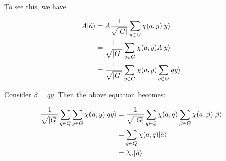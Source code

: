 \documentclass[12pt]{report}
\begin{document}
To see this, we have

        \begin{align}
            A\lvert\hat{a}\rangle 
            &= A\frac{1}{\sqrt{|G|}}\sum_{y \in G}\chi(a,y)\lvert y\rangle \nonumber \\
            &= \frac{1}{\sqrt{|G|}}\sum_{y \in G}\chi(a,y)A\lvert y\rangle \nonumber \\
            &= \frac{1}{\sqrt{|G|}}\sum_{y \in G}\chi(a,y)\sum_{q \in Q}\lvert qy\rangle \nonumber
            \end{align}
            
            \noindent Consider $\beta = qy$. Then the above equation becomes:
            
            \begin{align}
            \frac{1}{\sqrt{|G|}}\sum_{q \in Q} \sum_{y \in G} \chi(a,y)\lvert qy\rangle 
            &= \frac{1}{\sqrt{|G|}}\sum_{q \in Q} \chi(a,q) \sum_{\beta \in G} \chi(a,\beta)\lvert\beta\rangle \nonumber \\
            &= \sum_{q \in Q} \chi(a,q)\lvert\hat{a}\rangle \nonumber \\
            &= \lambda_a\lvert\hat{a}\rangle \label{eq:group_action_walk}
            \end{align}
            



\end{document}
